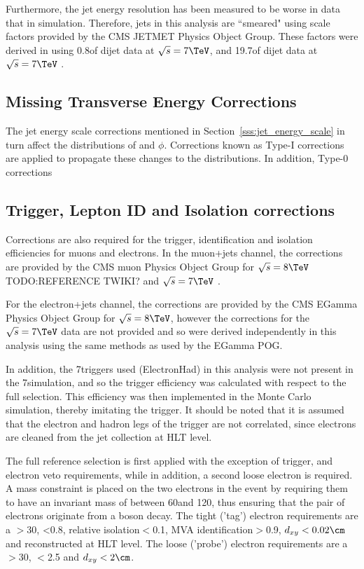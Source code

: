 Furthermore, the jet energy resolution has been measured to be worse in data that in simulation.
Therefore, jets in this analysis are ``smeared" using scale factors provided by the CMS JETMET Physics Object
Group. These factors were derived in \cite{Chatrchyan:2011ds} using 0.8\fbinv of dijet data at
$\sqrt{s}=7\TeV$, and 19.7\fbinv of dijet data at $\sqrt{s}=7\TeV$ \cite{jet_res_2012}.

\subsection{Missing Transverse Energy Corrections}
\label{ss:met_corrections}
The jet energy scale corrections mentioned in Section~\ref{sss:jet_energy_scale} in turn affect the
distributions of \met and \met $\phi$. Corrections known as Type-I \met corrections are applied to propagate
these changes to the \met distributions. In addition, Type-0 corrections 
 
\subsection{Trigger, Lepton ID and Isolation corrections}
\label{ss:trigger_ID_isolation_corrections}
Corrections are also required for the trigger, identification and isolation efficiencies for muons and
electrons. In the muon+jets channel, the corrections are provided by the CMS muon Physics Object Group
for $\sqrt{s}=8\TeV$ TODO:REFERENCE TWIKI? %
and $\sqrt{s}=7\TeV$ \cite{CMS-PAS-SMP-13-013}.

For the electron+jets channel, the corrections are provided by the CMS EGamma Physics Object Group for
$\sqrt{s}=8\TeV$, however the corrections for the $\sqrt{s}=7\TeV$ data are not provided and so were derived
independently in this analysis using the same methods as used by the EGamma POG.

In addition, the 7\TeV triggers used (ElectronHad) in this analysis were not present in the 7\TeV simulation,
and so the trigger efficiency was calculated with respect to the full selection. This efficiency was then implemented in
the Monte Carlo simulation, thereby imitating the trigger. It should be noted that it is assumed that the
electron and hadron legs of the trigger are not correlated, since electrons are cleaned from the jet
collection at HLT level.

The full reference selection is first applied with the exception of trigger, \btagging and electron veto
requirements, while in addition, a second loose electron is required. A \Z mass constraint is placed on the
two electrons in the event by requiring them to have an invariant mass of between 60\GeV and 120\GeV, thus
ensuring that the pair of electrons originate from a \Z boson decay. The tight ('tag') electron requirements
are a \pt$>$30\GeV, \abseta<0.8, relative isolation$<$0.1, MVA identification$>$0.9, $d_{xy}<0.02\cm$ and
reconstructed at HLT level. The loose ('probe') electron requirements are a \pt$>$30\GeV, \abseta$<$2.5 and
$d_{xy}<2\cm$.

